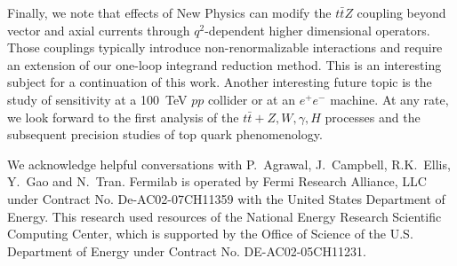 \documentclass{JHEP3}
\def\ttbZ{t\bar{t}Z}
\def\ttb{t\bar{t}}
\begin{document}
Finally, we note that effects of New Physics can modify the $\ttbZ$ coupling beyond vector and axial currents through $q^2$-dependent  higher dimensional operators. 
Those couplings typically introduce non-renormalizable interactions and require an extension of our one-loop integrand reduction method. 
This is an interesting subject for a continuation of this work.
Another interesting future topic is the study of sensitivity at a 100~TeV $pp$ collider or at an $e^+ e^-$ machine.
At any rate, we look forward to the first analysis of the $\ttb+Z,W,\gamma,H$ processes and the subsequent precision studies of top quark phenomenology.



\acknowledgments
We acknowledge helpful conversations with P.~Agrawal, J.~Campbell, R.K.~Ellis, Y.~Gao and N.~Tran. Fermilab is operated by Fermi Research Alliance, LLC under Contract No. De-AC02-07CH11359 with the United States Department of Energy. This research used resources of the National Energy Research Scientific Computing Center, which is supported by the Office of Science of the U.S. Department of Energy under Contract No. DE-AC02-05CH11231.





\end{document}
